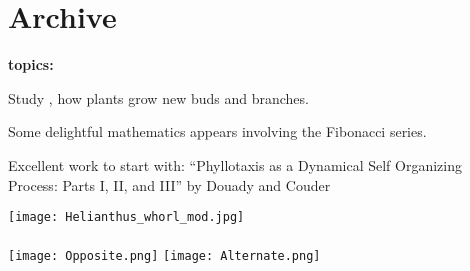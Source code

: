 



\section{Archive}

  \textbf{topics:}

  
      
    
    
      Study , how plants grow new
      buds and branches.  
    
      Some delightful mathematics appears involving
      the Fibonacci series.
    
      Excellent work to start with:
      ``Phyllotaxis as a Dynamical Self Organizing Process: Parts I, II, and III''
      by Douady and Couder\cite{douady1996a,douady1996b,douady1996c}
    
    
    \texttt{[image: Helianthus\_whorl\_mod.jpg]}\\
    {\tiny{}}\\
    \texttt{[image: Opposite.png]}
    \texttt{[image: Alternate.png]}\\
    {\tiny{}}
    

